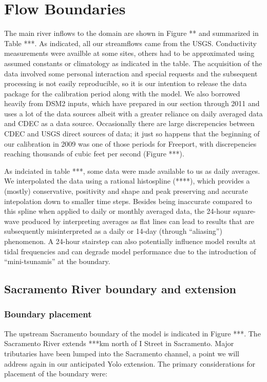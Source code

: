 \section{Flow Boundaries}
The main river inflows to the domain are shown in Figure ** and summarized in Table ***. As indicated, all our 
streamflows came from the USGS. Conductivity measurements were availble at some sites, others had to be approximated using
assumed constants or climatology as indicated in the table. The acquisition of the data involved some personal 
interaction and special requests and the subsequent processing is not easily reproducible, so it is our intention 
to release the data package for the calibration period along with the model. We also borrowed heavily from DSM2 inputs,
which have prepared in our section through 2011 and uses a lot of the data sources albeit with a greater reliance on
daily averaged data and CDEC as a data source. Occasionally there are large discrepencies between CDEC and USGS direct
sources of data; it just so happens that the beginning of our calibration in 2009 was one of those periods for Freeport,
with discrepencies reaching thousands of cubic feet per second (Figure ***).

As indciated in table ***, some data were made available to us as daily averages.
We interpolated the data using a rational histospline (****), which provides a (mostly) conservative, 
positivity and shape and peak preserving and accurate intepolation down to smaller time steps. 
Besides being inaccurate compared to this spline when applied to daily or monthly averaged data, 
the 24-hour square-wave produced by interpreting averages as flat lines can lead to results that are
subsequently misinterpreted as a daily or 14-day (through "`aliasing"') phenomenon. A 24-hour stairstep can also potentially influence model 
results at tidal frequencies and can degrade model performance due to the introduction of "`mini-tsunamis"' at the boundary. 


\subsection{Sacramento River boundary and extension}

\subsubsection{Boundary placement}
The upstream Sacramento boundary of the model is indicated in Figure ***.  The Sacramento River extends ***km north of I Street in Sacramento. Major tributaries have been lumped into the Sacramento channel, a point we will address again in our anticipated Yolo extension. The primary considerations for placement of the boundary were:

